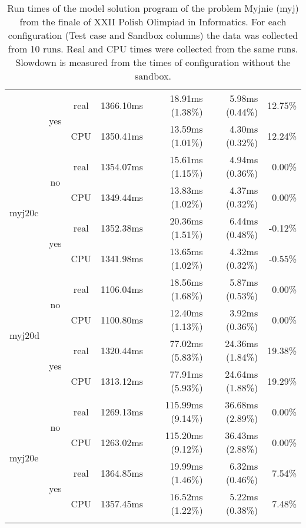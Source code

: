 \documentclass[en]{pracamgr}
\begin{document}
\begin{appendices}
\begin{small}
\begin{longtable}{|l|c|c|r|r|r|r|}
                          \cline{2-7}
                          & \multirow{2}{*}{yes} & real & 1366.10ms & 18.91ms (1.38\%) & 5.98ms (0.44\%) & 12.75\% \\*
                          &                      & CPU  & 1350.41ms & 13.59ms (1.01\%) & 4.30ms (0.32\%) & 12.24\% \\
\hline
\multirow{4}{*}{myj20c}   & \multirow{2}{*}{no}  & real & 1354.07ms & 15.61ms (1.15\%) & 4.94ms (0.36\%) & 0.00\% \\*
                          &                      & CPU  & 1349.44ms & 13.83ms (1.02\%) & 4.37ms (0.32\%) & 0.00\% \\*
                          \cline{2-7}
                          & \multirow{2}{*}{yes} & real & 1352.38ms & 20.36ms (1.51\%) & 6.44ms (0.48\%) & -0.12\% \\*
                          &                      & CPU  & 1341.98ms & 13.65ms (1.02\%) & 4.32ms (0.32\%) & -0.55\% \\
\hline
\multirow{4}{*}{myj20d}   & \multirow{2}{*}{no}  & real & 1106.04ms & 18.56ms (1.68\%) & 5.87ms (0.53\%) & 0.00\% \\*
                          &                      & CPU  & 1100.80ms & 12.40ms (1.13\%) & 3.92ms (0.36\%) & 0.00\% \\*
                          \cline{2-7}
                          & \multirow{2}{*}{yes} & real & 1320.44ms & 77.02ms (5.83\%) & 24.36ms (1.84\%) & 19.38\% \\*
                          &                      & CPU  & 1313.12ms & 77.91ms (5.93\%) & 24.64ms (1.88\%) & 19.29\% \\
\hline
\multirow{4}{*}{myj20e}   & \multirow{2}{*}{no}  & real & 1269.13ms & 115.99ms (9.14\%) & 36.68ms (2.89\%) & 0.00\% \\*
                          &                      & CPU  & 1263.02ms & 115.20ms (9.12\%) & 36.43ms (2.88\%) & 0.00\% \\*
                          \cline{2-7}
                          & \multirow{2}{*}{yes} & real & 1364.85ms & 19.99ms (1.46\%) & 6.32ms (0.46\%) & 7.54\% \\*
                          &                      & CPU  & 1357.45ms & 16.52ms (1.22\%) & 5.22ms (0.38\%) & 7.48\% \\
\hline
\caption{Run times of the model solution program of the problem Myjnie (myj) from the finale of XXII Polish Olimpiad in Informatics. For each configuration (Test case and Sandbox columns) the data was collected from 10 runs. Real and CPU times were collected from the same runs. Slowdown is measured from the times of configuration without the sandbox.}
\label{table:myj_model_solution_runtimes}
\end{longtable}
\end{small}


\end{appendices}
\end{document}

